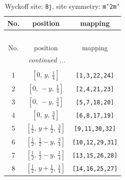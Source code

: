 \documentclass[fleqn,8pt]{jsarticle}
\begin{document}
\begin{longtable}{ccc}
\caption{Wyckoff site: {\tt 8j}, site symmetry: {\tt m'2m'}}
 \\
 \hline \hline
No. & position & mapping \\ \hline \endfirsthead

\multicolumn{2}{l}{\tablename\ \thetable{}} \\
 \hline \hline
No. & position & mapping \\ \hline \endhead

 \hline \hline
\multicolumn{2}{r}{\footnotesize\it continued ...} \\ \endfoot

 \hline \hline
\multicolumn{2}{r}{} \\ \endlastfoot

1 & $\left[ 0,\, y,\, \frac{1}{4} \right]$ & {\tt [1,3,22,24]} \\ \hline
2 & $\left[ 0,\, - y,\, \frac{1}{4} \right]$ & {\tt [2,4,21,23]} \\ \hline
3 & $\left[ 0,\, - y,\, \frac{3}{4} \right]$ & {\tt [5,7,18,20]} \\ \hline
4 & $\left[ 0,\, y,\, \frac{3}{4} \right]$ & {\tt [6,8,17,19]} \\ \hline
5 & $\left[ \frac{1}{2},\, y + \frac{1}{2},\, \frac{3}{4} \right]$ & {\tt [9,11,30,32]} \\ \hline
6 & $\left[ \frac{1}{2},\, \frac{1}{2} - y,\, \frac{3}{4} \right]$ & {\tt [10,12,29,31]} \\ \hline
7 & $\left[ \frac{1}{2},\, \frac{1}{2} - y,\, \frac{1}{4} \right]$ & {\tt [13,15,26,28]} \\ \hline
8 & $\left[ \frac{1}{2},\, y + \frac{1}{2},\, \frac{1}{4} \right]$ & {\tt [14,16,25,27]} \\
\end{longtable}
\renewcommand{\arraystretch}{1.2}
\end{document}
